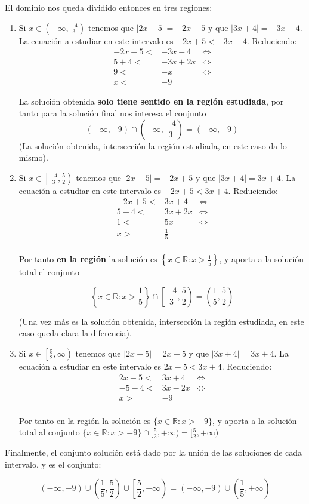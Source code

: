 \documentclass[10pt,a4paper]{article}
\begin{document}
El dominio nos queda dividido entonces en tres regiones:
\begin{enumerate}
\item
  Si $x \in \left(-\infty, \frac{-4}{3}\right)$ tenemos que $|2x-5| = -2x+5$
  y que
  $|3x+4| = -3x-4$.
  La ecuación a estudiar en este intervalo es $ -2x+5 < -3x-4$.
  Reduciendo:
  \begin{align*}
    -2x+5 <& -3x-4    & \iff \\
    5 + 4 <& -3x + 2x & \iff \\
    9     <& -x       & \iff \\
    x     <& -9 &
  \end{align*}

  La solución obtenida {\bf solo tiene sentido en la región estudiada},
  por tanto para la solución final nos interesa el conjunto
  $$(-\infty, -9) \cap \left(-\infty, \frac{-4}{3}\right) = (-\infty, -9)$$
  (La solución obtenida, intersección la región estudiada, en este caso da
  lo mismo).
  
\item
  Si $x \in \left[\frac{-4}{3}, \frac{5}{2}\right)$
    tenemos que $|2x-5| = -2x+5$ y que
  $|3x+4| = 3x+4$.
  La ecuación a estudiar en este intervalo es $ -2x+5 < 3x+4$.
  Reduciendo:
  \begin{align*}
    -2x+5  <& 3x+4     & \iff \\
     5 - 4 <& 3x + 2 x & \iff \\
     1     <& 5x       & \iff \\
     x     >& \frac{1}{5} &\\
  \end{align*}

  Por tanto {\bf en la región} la solución es
  $\left\lbrace x\in \mathbb{R} : x > \frac{1}{5}\right\rbrace$,
  y aporta a la solución total el conjunto \newline
  
  $$\left\lbrace x\in \mathbb{R} : x > \frac{1}{5}\right\rbrace
  \cap \left[\frac{-4}{3}, \frac{5}{2}\right)
    = \left(\frac{1}{5}, \frac{5}{2}\right)$$

  (Una vez más es la solución obtenida, intersección la región estudiada,
  en este caso queda clara la diferencia).
  

\item
  Si $x \in \left[\frac{5}{2},\infty\right)$ tenemos que $|2x-5| = 2x-5$ y que
  $|3x+4| = 3x+4$.
  La ecuación a estudiar en este intervalo es $ 2x-5 < 3x+4$.
  Reduciendo:
  \begin{align*}
    2x-5  <& 3x+4       & \iff \\
     -5 - 4 <& 3x - 2 x & \iff \\
     x >& -9 \\
  \end{align*}

  \noindent
  Por tanto en la región la solución es
  $\{ x\in \mathbb{R} : x > -9 \}$, y aporta a la solución total al conjunto
  $\{ x\in \mathbb{R} : x > -9 \} \cap [\frac{5}{2},+\infty)
    = [\frac{5}{2},+\infty)$
  
\end{enumerate}

Finalmente, el conjunto solución está dado por la unión de las soluciones
de cada intervalo, y es el conjunto:

$$(-\infty, -9) \cup \left(\frac{1}{5},
\frac{5}{2}\right) \cup \left[\frac{5}{2},+\infty\right)
  = (-\infty, -9) \cup \left(\frac{1}{5}, +\infty\right)$$
\end{document}
